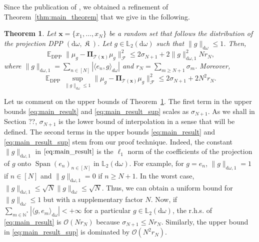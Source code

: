 \documentclass[twoside,11pt]{book}
\newtheorem{theorem}{Theorem}
\numberwithin{theorem}{chapter}
\numberwithin{definition}{chapter}
\numberwithin{proposition}{chapter}
\numberwithin{corollary}{chapter}
\numberwithin{example}{chapter}
\numberwithin{lemma}{chapter}
\numberwithin{assumption}{chapter}
\DeclareMathOperator{\Span}{\mathrm{Span}}
\DeclareMathOperator{\DPP}{\mathrm{DPP}}
\DeclareMathOperator{\EX}{\mathbb{E}}
\DeclareMathOperator*{\KDPP}{\mathfrak{K}}
\begin{document}
Since the publication of \citep{BeBaCh19}, we obtained a refinement of Theorem~\ref{thm:main_theorem} that we give in the following.


\begin{theorem}\label{thm:main_theorem_improved}
Let $\bm{x} = \{x_{1}, \dots , x_{N}\}$ be a random set that follows the distribution of the projection DPP $(\mathrm{d}\omega, \KDPP )$. Let $g \in \mathbb{L}_{2}(\mathrm{d}\omega)$ such that $\|g\|_{\mathrm{d}\omega} \leq 1$. Then, 
\begin{equation}\label{eq:main_result}
\EX_{\DPP} \|\mu_{g} - \bm{\Pi}_{\mathcal{T}(\bm{x})} \mu_{g}\|_{\mathcal{F}}^{2}  \leq
2\sigma_{N+1} +2\|g\|_{\mathrm{d}\omega,1}^{2} N r_{N} ,
\end{equation}
where $\displaystyle \|g\|_{\mathrm{d}\omega,1} = \sum\limits_{n \in [N]} |\langle e_{n},g \rangle_{d\omega}|$ and $r_{N} = \sum\limits_{m \geq N+1} \sigma_{m}$. Moreover, 
\begin{equation}\label{eq:main_result_sup}
\EX_{\DPP} \sup\limits_{\|g\|_{\mathrm{d}\omega} \leq 1} \|\mu_{g} - \bm{\Pi}_{\mathcal{T}(\bm{x})} \mu_{g}\|_{\mathcal{F}}^{2}  \leq
2\sigma_{N+1} +2N^{2} r_{N}.
\end{equation}
\end{theorem}

Let us comment on the upper bounds of Theorem~\ref{thm:main_theorem_improved}. The first term in the upper bounds \eqref{eq:main_result} and \eqref{eq:main_result_sup} scales as $\sigma_{N+1}$. As we shall in Section ??, $\sigma_{N+1}$ is the lower bound of interpolation in a sense that will be defined. The second terms in the upper bounds \eqref{eq:main_result} and \eqref{eq:main_result_sup} stem from our proof technique. Indeed, the constant $\|g\|_{\mathrm{d}\omega,1}$ in $\eqref{eq:main_result}$ is the $\ell_1$ norm of the coefficients of the projection of $g$ onto $\Span(e_{n})_{n \in [N]}$ in $\mathbb{L}_{2}(\mathrm{d}\omega)$. For example, for $g = e_{n}$, $\|g\|_{\mathrm{d}\omega,1} = 1$ if $n \in [N]$ and $\|g\|_{\mathrm{d}\omega,1} = 0$ if $n \geq N+1$. In the worst case, $\|g\|_{\mathrm{d}\omega,1} \leq \sqrt{N} \|g\|_{\mathrm{d}\omega} \leq \sqrt{N}$.
Thus, we can obtain a uniform bound for $\|g\|_{\mathrm{d}\omega}\leq 1$ but with a supplementary factor $N$. Now, if $\sum\limits_{m \in \mathbb{N}^{*}} |\langle g,e_{m} \rangle_{\mathrm{d}\omega}| < +\infty$ for a particular $g \in \mathbb{L}_{2}(\mathrm{d}\omega)$, the r.h.s. of \eqref{eq:main_result} is $\mathcal{O}(Nr_{N})$ because $\sigma_{N+1} \leq Nr_{N}$. Similarly, the upper bound in \eqref{eq:main_result_sup} is dominated by $\mathcal{O}(N^{2}r_{N})$.
\end{document}
